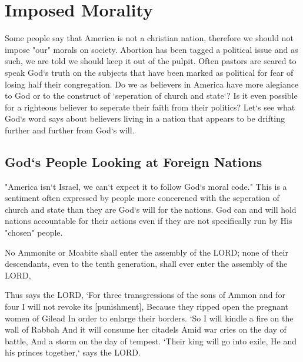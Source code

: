 \chapter{Imposed Morality}

\begin{fullwidth}
Some people say that America is not a christian nation, therefore we should not impose "our" morals on society. Abortion has been 
tagged a political issue and as such, we are told we should keep it out of the pulpit. Often pastors are scared to speak God`s truth on the subjects that have been marked as political for fear of losing half their congregation. 
Do we as believers in America have more alegiance to God or to the construct of `seperation of church and state`? Is it even possible for a 
righteous believer to seperate their faith from their politics? Let`s see what God`s word says about believers living in a nation that appears to be drifting further and further from God`s will.
\end{fullwidth}


\section{God`s People Looking at Foreign Nations}
"America isn`t Israel, we can`t expect it to follow God`s moral code."  This is a sentiment often expressed by people more concerened with the seperation of church and state than they are God`s will for the nations.
God can and will hold nations accountable for their actions even if they are not specifically run by His "chosen" people. 

\begin{scripture}[Deuteronomy 23:3]
    No Ammonite or Moabite shall enter the assembly of the LORD; none of their descendants, even to the tenth generation, shall ever enter the assembly of the LORD,
\end{scripture}

\begin{scripture}[Amos 1:13-15]
    Thus says the LORD, `For three transgressions of the sons of Ammon and for four I will not revoke its [punishment], Because they ripped open the pregnant women of Gilead In order to enlarge their borders.
    `So I will kindle a fire on the wall of Rabbah And it will consume her citadels Amid war cries on the day of battle, And a storm on the day of tempest.
    `Their king will go into exile, He and his princes together,` says the LORD. 
\end{scripture}

